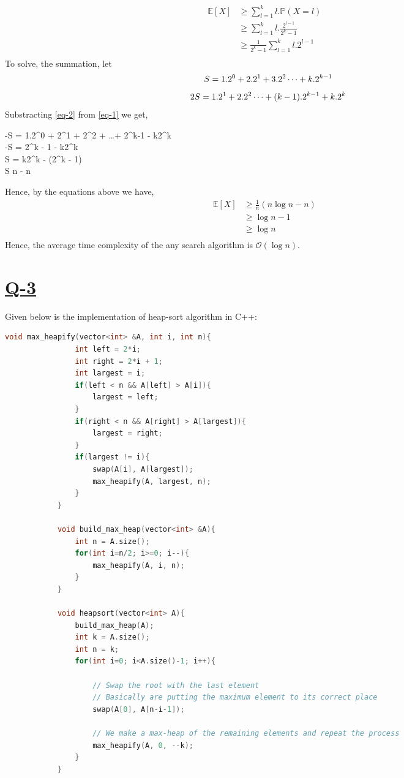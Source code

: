 \documentclass[14pt]{article}
\begin{document}
			\begin{align*} 
				\mathbb{E}[X] &\geq \sum_{l=1}^{k}l.\mathbb{P}(X=l) &\\
				&\geq \sum_{l=1}^{k}l.\frac{2^{l-1}}{2^k - 1} &\\
				&\geq \frac{1}{2^k - 1}\sum_{l=1}^{k}l.2^{l-1} &\\
			\end{align*}
			To solve, the summation, let 
			\begin{equation}\label{eq-1}
				S = 1.2^{0} + 2.2^{1} + 3.2^{2} \dots + k.2^{k-1}\\
			\end{equation}
			\begin{equation}\label{eq-2}
				2S = 1.2^{1} + 2.2^{2} \dots + (k-1).2^{k-1} + k.2^{k}\\
			\end{equation}
			Substracting \ref{eq-2} from \ref{eq-1} we get, 
			\begin{flalign*}
				-S = 1.2^0 + 2^1 + 2^2 + \dots + 2^{k-1} - k2^k\\
				-S = 2^k - 1 - k2^k\\
				S = k2^k - (2^k - 1)\\
				\implies S \geq n - n
			\end{flalign*} 
			Hence, by the equations above we have,
			\begin{align*}
				\mathbb{E}[X] &\geq \frac{1}{n}(n\log{n} - n) &\\
				&\geq \log{n} - 1 &\\
				&\geq \log{n} &\\
			\end{align*}
		Hence, the average time complexity of the any search algorithm is $\mathcal{O}(\log{n})$.
		\newpage
		
	\section*{\underline{Q-3}}
		Given below is the implementation of heap-sort algorithm in C++:
		\begin{lstlisting}[language=C++]
			void max_heapify(vector<int> &A, int i, int n){
				int left = 2*i;
				int right = 2*i + 1;
				int largest = i;
				if(left < n && A[left] > A[i]){
					largest = left;
				}
				if(right < n && A[right] > A[largest]){
					largest = right;
				}
				if(largest != i){
					swap(A[i], A[largest]);
					max_heapify(A, largest, n);
				}
			}
			
			void build_max_heap(vector<int> &A){
				int n = A.size();
				for(int i=n/2; i>=0; i--){
					max_heapify(A, i, n);
				}
			}
			
			void heapsort(vector<int> A){
				build_max_heap(A);
				int k = A.size();
				int n = k;
				for(int i=0; i<A.size()-1; i++){
					
					// Swap the root with the last element
					// Basically are putting the maximum element to its correct place
					swap(A[0], A[n-i-1]);
					
					// We make a max-heap of the remaining elements and repeat the process
					max_heapify(A, 0, --k);
				}
			}
		\end{lstlisting}
		
\end{document}

